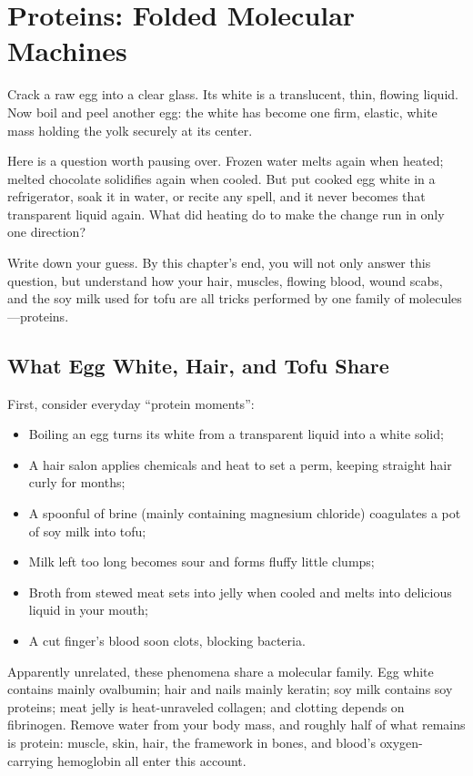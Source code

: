 \chapter{Proteins: Folded Molecular Machines}

\begin{kaichang}
Crack a raw egg into a clear glass. Its white is a translucent, thin, flowing liquid. Now boil and peel another egg: the white has become one firm, elastic, white mass holding the yolk securely at its center.

Here is a question worth pausing over. Frozen water melts again when heated; melted chocolate solidifies again when cooled. But put cooked egg white in a refrigerator, soak it in water, or recite any spell, and it never becomes that transparent liquid again. What did heating do to make the change run in only one direction?

Write down your guess. By this chapter's end, you will not only answer this question, but understand how your hair, muscles, flowing blood, wound scabs, and the soy milk used for tofu are all tricks performed by one family of molecules---proteins.
\end{kaichang}

\section{What Egg White, Hair, and Tofu Share}

First, consider everyday ``protein moments'':

\begin{itemize}[itemsep=2pt]
\item Boiling an egg turns its white from a transparent liquid into a white solid;
\item A hair salon applies chemicals and heat to set a perm, keeping straight hair curly for months;
\item A spoonful of brine (mainly containing magnesium chloride) coagulates a pot of soy milk into tofu;
\item Milk left too long becomes sour and forms fluffy little clumps;
\item Broth from stewed meat sets into jelly when cooled and melts into delicious liquid in your mouth;
\item A cut finger's blood soon clots, blocking bacteria.
\end{itemize}

Apparently unrelated, these phenomena share a molecular family. Egg white contains mainly ovalbumin; hair and nails mainly keratin; soy milk contains soy proteins; meat jelly is heat-unraveled collagen; and clotting depends on fibrinogen. Remove water from your body mass, and roughly half of what remains is protein: muscle, skin, hair, the framework in bones, and blood's oxygen-carrying hemoglobin all enter this account.

